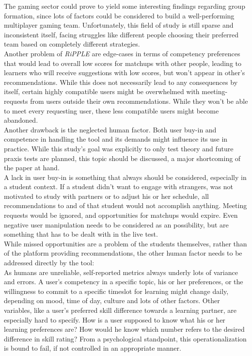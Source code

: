 \documentclass[conference]{IEEEtran}
\begin{document}
The gaming sector could prove to yield some interesting findings regarding group formation, since lots of factors could be considered to build a well-performing multiplayer gaming team. \cite{delalleau2012beyond, wang2015thinking, suznjevic2015application} Unfortunately, this field of study is still sparse and inconsistent itself, facing struggles like different people choosing their preferred team based on completely different strategies. \cite{riegelsberger2007personality}\\
Another problem of \textit{RiPPLE} are edge-cases in terms of competency preferences that would lead to overall low scores for matchups with other people, leading to learners who will receive suggestions with low scores, but won't appear in other's recommendations. While this does not necessarily lead to any consequences by itself, certain highly compatible users might be overwhelmed with meeting-requests from users outside their own recommendations. While they won't be able to meet every requesting user, these less compatible users might become abandoned.\\
Another drawback is the neglected human factor. Both user buy-in and competence in handling the tool and its demands might influence its use in practice. While this study's goal was explicitly to only test theory and future praxis tests are planned, this topic should be discussed, a major shortcoming of the paper at hand.\\
A lack in user buy-in is something that always should be considered, especially in a student context. If a student didn't want to engage with strangers, was not motivated to study with partners or to adjust his or her schedule, all recommendations to and of that student would not accomplish anything. Meeting requests would be ignored, and opportunities for matchups would expire. Even negative user manipulation needs to be considered as an possibility, but are something that has to be dealt with in the live test.\\
While missed opportunities are a problem of the students themselves, rather than of the platform providing recommendations, the other human factor needs to be addressed directly by the tool:\\
As humans are unreliable, self-reported metrics always underly lots of variance and errors. A user's competency in a specific topic, his or her preferences, or the willingness to commit to a specific timeslot for learning might change daily, depending on mood, time of day, culture and lots of other factors. \cite{lee2002cultural} \cite{sorensen2008measuring} Other variables, like a user's preferred skill difference towards a learning partner, are especially hard to specify. How is a user supposed to know what his or her learning preferences are? How would he know which number refers to the desired difference in skill rating? From a psychological standpoint, this operationalization is bound to fail, if not controlled in an appropriate manner. \cite{gonyea2005self}\\
\end{document}
